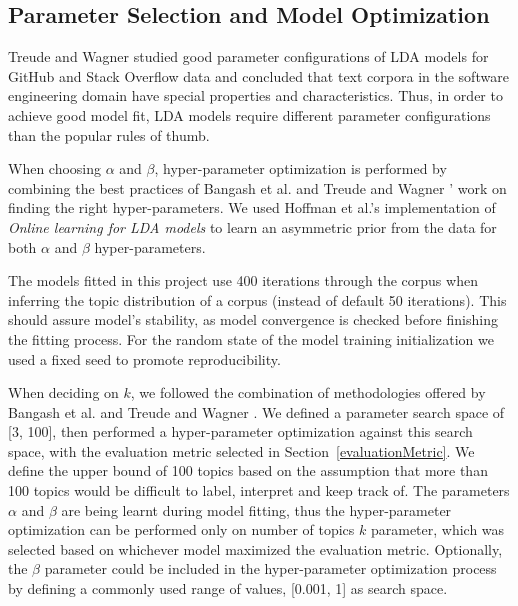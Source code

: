     \subsection{Parameter Selection and Model Optimization}
    
        Treude and Wagner \cite{treude2019predicting} studied good parameter configurations of LDA models for GitHub and Stack Overflow data and concluded that text corpora in the software engineering domain have special properties and characteristics. Thus,  in order to achieve good model fit, LDA models require different parameter configurations than the popular rules of thumb.
        
        When choosing $\alpha$ and $\beta$, hyper-parameter optimization is performed by combining the best practices of Bangash et al. \cite{bangash2019developers} and Treude and Wagner \cite{treude2019predicting}' work on finding the right hyper-parameters. We used Hoffman et al.'s implementation of \textit{Online learning for LDA models} \cite{hoffman2010online} to learn an asymmetric prior from the data for both $\alpha$ and $\beta$ hyper-parameters.
        
        The models fitted in this project use 400 iterations through the corpus when inferring the topic distribution of a corpus (instead of default 50 iterations). This should assure model's stability, as model convergence is checked before finishing the fitting process. For the random state of the model training initialization we used a fixed seed to promote reproducibility.
        
        \label{sec:hyper-parameter_selection}When deciding on $k$, we followed the combination of methodologies offered by Bangash et al. \cite{bangash2019developers} and Treude and Wagner \cite{treude2019predicting}. We defined a parameter search space of [3, 100], then performed a hyper-parameter optimization against this search space, with the evaluation metric selected in Section~\ref{evaluationMetric}. We define the upper bound of 100 topics based on the assumption that more than 100 topics would be difficult to label, interpret and keep track of. The parameters $\alpha$ and $\beta$ are being learnt during model fitting, thus  the hyper-parameter optimization can be performed only on number of topics $k$ parameter, which was selected based on whichever model maximized the evaluation metric. Optionally, the $\beta$ parameter could be included in the hyper-parameter optimization process by defining a commonly used range of values, [0.001, 1] as search space.
    
